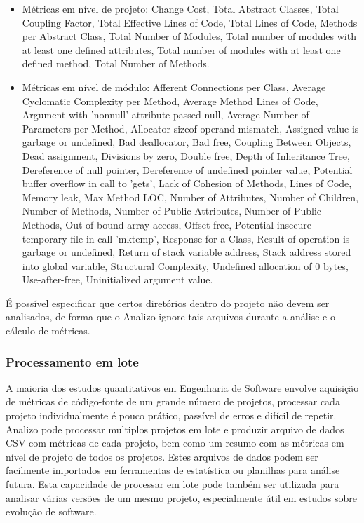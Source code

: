 \begin{itemize}

  \item Métricas em nível de projeto: Change Cost, Total Abstract Classes,
  Total Coupling Factor, Total Effective Lines of Code, Total Lines of Code,
  Methods per Abstract Class, Total Number of Modules, Total number of modules
  with at least one defined attributes, Total number of modules with at least
  one defined method, Total Number of Methods.

  \item Métricas em nível de módulo: Afferent Connections per Class, Average
  Cyclomatic Complexity per Method, Average Method Lines of Code, Argument with
  'nonnull' attribute passed null, Average Number of Parameters per Method,
  Allocator sizeof operand mismatch, Assigned value is garbage or undefined,
  Bad deallocator, Bad free, Coupling Between Objects, Dead assignment,
  Divisions by zero, Double free, Depth of Inheritance Tree, Dereference of
  null pointer, Dereference of undefined pointer value, Potential buffer
  overflow in call to 'gets', Lack of Cohesion of Methods, Lines of Code,
  Memory leak, Max Method LOC, Number of Attributes, Number of Children, Number
  of Methods, Number of Public Attributes, Number of Public Methods,
  Out-of-bound array access, Offset free, Potential insecure temporary file in
  call 'mktemp', Response for a Class, Result of operation is garbage or
  undefined, Return of stack variable address, Stack address stored into global
  variable, Structural Complexity, Undefined allocation of 0 bytes,
  Use-after-free, Uninitialized argument value.

\end{itemize}

É possível especificar que certos diretórios dentro do projeto não devem ser
analisados, de forma que o Analizo ignore tais arquivos durante a análise e o
cálculo de métricas.

\subsubsection{Processamento em lote}\label{lote}

A maioria dos estudos quantitativos em Engenharia de Software envolve aquisição
de métricas de código-fonte de um grande número de projetos, processar cada
projeto individualmente é pouco prático, passível de erros e difícil de
repetir. Analizo pode processar multiplos projetos em lote e produzir arquivo
de dados CSV com métricas de cada projeto, bem como um resumo com as métricas
em nível de projeto de todos os projetos. Estes arquivos de dados podem ser
facilmente importados em ferramentas de estatística ou planilhas para análise
futura. Esta capacidade de processar em lote pode também ser utilizada para
analisar várias versões de um mesmo projeto, especialmente útil em estudos
sobre evolução de software.

